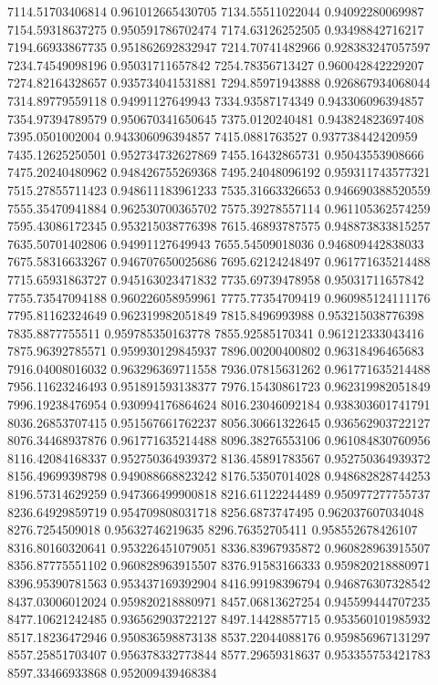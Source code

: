 {7114.51703406814 0.961012665430705
7134.55511022044 0.94092280069987
7154.59318637275 0.950591786702474
7174.63126252505 0.93498842716217
7194.66933867735 0.951862692832947
7214.70741482966 0.928383247057597
7234.74549098196 0.95031711657842
7254.78356713427 0.960042842229207
7274.82164328657 0.935734041531881
7294.85971943888 0.926867934068044
7314.89779559118 0.94991127649943
7334.93587174349 0.943306096394857
7354.97394789579 0.950670341650645
7375.0120240481 0.943824823697408
7395.0501002004 0.943306096394857
7415.0881763527 0.937738442420959
7435.12625250501 0.952734732627869
7455.16432865731 0.95043553908666
7475.20240480962 0.948426755269368
7495.24048096192 0.959311743577321
7515.27855711423 0.948611183961233
7535.31663326653 0.946690388520559
7555.35470941884 0.962530700365702
7575.39278557114 0.961105362574259
7595.43086172345 0.953215038776398
7615.46893787575 0.948873833815257
7635.50701402806 0.94991127649943
7655.54509018036 0.946809442838033
7675.58316633267 0.946707650025686
7695.62124248497 0.961771635214488
7715.65931863727 0.945163023471832
7735.69739478958 0.95031711657842
7755.73547094188 0.960226058959961
7775.77354709419 0.960985124111176
7795.81162324649 0.962319982051849
7815.8496993988 0.953215038776398
7835.8877755511 0.959785350163778
7855.92585170341 0.961212333043416
7875.96392785571 0.959930129845937
7896.00200400802 0.96318496465683
7916.04008016032 0.963296369711558
7936.07815631262 0.961771635214488
7956.11623246493 0.951891593138377
7976.15430861723 0.962319982051849
7996.19238476954 0.930994176864624
8016.23046092184 0.938303601741791
8036.26853707415 0.951567661762237
8056.30661322645 0.936562903722127
8076.34468937876 0.961771635214488
8096.38276553106 0.961084830760956
8116.42084168337 0.952750364939372
8136.45891783567 0.952750364939372
8156.49699398798 0.949088668823242
8176.53507014028 0.948682828744253
8196.57314629259 0.947366499900818
8216.61122244489 0.950977277755737
8236.64929859719 0.954709808031718
8256.6873747495 0.962037607034048
8276.7254509018 0.95632746219635
8296.76352705411 0.958552678426107
8316.80160320641 0.953226451079051
8336.83967935872 0.960828963915507
8356.87775551102 0.960828963915507
8376.91583166333 0.959820218880971
8396.95390781563 0.953437169392904
8416.99198396794 0.946876307328542
8437.03006012024 0.959820218880971
8457.06813627254 0.945599444707235
8477.10621242485 0.936562903722127
8497.14428857715 0.953560101985932
8517.18236472946 0.950836598873138
8537.22044088176 0.959856967131297
8557.25851703407 0.956378332773844
8577.29659318637 0.953355753421783
8597.33466933868 0.952009439468384
}
